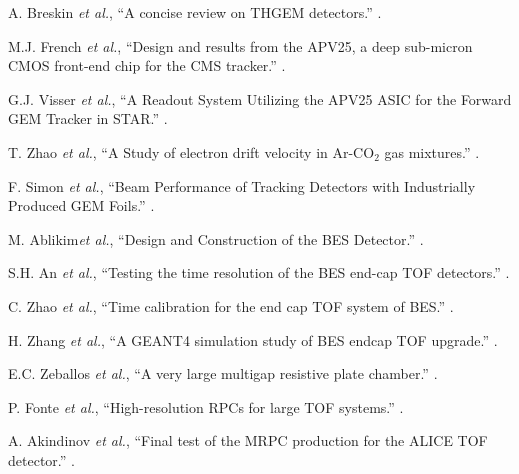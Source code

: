 \begin{thebibliography}{10}
A. Breskin {\it et al.},
\newblock ``A concise review on THGEM detectors.''
.

 M.J. French {\it et al.},
\newblock ``Design and results from the APV25, a deep sub-micron CMOS front-end chip for the CMS tracker.''
.
 
G.J. Visser {\it et al.},
\newblock ``A Readout System Utilizing the APV25 ASIC for the Forward GEM Tracker in STAR.'' 
.

T. Zhao {\it et al.},
\newblock ``A Study of electron drift velocity in Ar-CO$_{2}$ gas mixtures.''
.

F. Simon {\it et al.},
\newblock ``Beam Performance of Tracking Detectors with Industrially Produced GEM Foils.''
.

M. Ablikim{\it et al.},
\newblock ``Design and Construction of the BES\uppercase\expandafter{} Detector.''
.

S.H. An {\it et al.},
\newblock ``Testing the time resolution of the BES\uppercase\expandafter{} end-cap TOF detectors.''
.

C. Zhao {\it et al.},
\newblock ``Time calibration for the end cap TOF system of BES\uppercase\expandafter{}.''
.

H. Zhang {\it et al.},
\newblock ``A GEANT4 simulation study of BES\uppercase\expandafter{} endcap TOF upgrade.''
.

E.C. Zeballos {\it et al.},
\newblock ``A very large multigap resistive plate chamber.''
.

P. Fonte {\it et al.},
\newblock ``High-resolution RPCs for large TOF systems.''
.

A. Akindinov {\it et al.},
\newblock ``Final test of the MRPC production for the ALICE TOF detector.''
.


\end{thebibliography}
